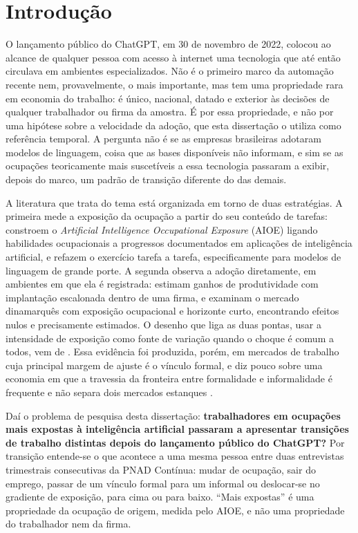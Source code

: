 \section{Introdução}
\label{sec:introducao}

O lançamento público do ChatGPT, em 30 de novembro de 2022, colocou ao alcance
de qualquer pessoa com acesso à internet uma tecnologia que até então circulava
em ambientes especializados. Não é o primeiro marco da automação recente nem,
provavelmente, o mais importante, mas tem uma propriedade rara em economia do
trabalho: é único, nacional, datado e exterior às decisões de qualquer
trabalhador ou firma da amostra. É por essa propriedade, e não por uma hipótese
sobre a velocidade da adoção, que esta dissertação o utiliza como referência
temporal. A pergunta não é se as empresas brasileiras adotaram modelos de
linguagem, coisa que as bases disponíveis não informam, e sim se as ocupações
teoricamente mais suscetíveis a essa tecnologia passaram a exibir, depois do
marco, um padrão de transição diferente do das demais.

A literatura que trata do tema está organizada em torno de duas estratégias.
A primeira mede a exposição da ocupação a partir do seu conteúdo de tarefas:
 constroem o \textit{Artificial Intelligence Occupational
Exposure} (AIOE) ligando habilidades ocupacionais a progressos documentados em
aplicações de inteligência artificial, e  refazem o
exercício tarefa a tarefa, especificamente para modelos de linguagem de grande
porte. A segunda observa a adoção diretamente, em ambientes em que ela é
registrada:  estimam ganhos de produtividade com
implantação escalonada dentro de uma firma, e  examinam
o mercado dinamarquês com exposição ocupacional e horizonte curto, encontrando
efeitos nulos e precisamente estimados. O desenho que liga as duas pontas,
usar a intensidade de exposição como fonte de variação quando o choque é comum a
todos, vem de . Essa evidência foi produzida, porém, em
mercados de trabalho cuja principal margem de ajuste é o vínculo formal, e diz
pouco sobre uma economia em que a travessia da fronteira entre formalidade e
informalidade é frequente e não separa dois mercados estanques
\parencite{ulyssea2020,meghir2015}.

Daí o problema de pesquisa desta dissertação: \textbf{trabalhadores em ocupações
mais expostas à inteligência artificial passaram a apresentar transições de
trabalho distintas depois do lançamento público do ChatGPT?} Por transição
entende-se o que acontece a uma mesma pessoa entre duas entrevistas trimestrais
consecutivas da PNAD Contínua: mudar de ocupação, sair do emprego, passar de um
vínculo formal para um informal ou deslocar-se no gradiente de exposição, para
cima ou para baixo. ``Mais expostas'' é uma propriedade da ocupação de origem,
medida pelo AIOE, e não uma propriedade do trabalhador nem da firma.

